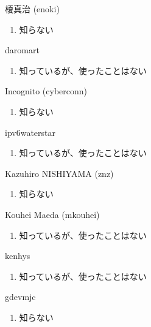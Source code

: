 \begin{prework}{ 榎真治 (enoki) }
  \begin{enumerate}
  \item 知らない
  \end{enumerate}
\end{prework}

\begin{prework}{ daromart }
  \begin{enumerate}
  \item 知っているが、使ったことはない
  \end{enumerate}
\end{prework}

\begin{prework}{ Incognito (cyberconn) }
  \begin{enumerate}
  \item 知らない
  \end{enumerate}
\end{prework}

\begin{prework}{ ipv6waterstar }
  \begin{enumerate}
  \item 知っているが、使ったことはない
  \end{enumerate}
\end{prework}

\begin{prework}{ Kazuhiro NISHIYAMA (znz) }
  \begin{enumerate}
  \item 知らない
  \end{enumerate}
\end{prework}

\begin{prework}{ Kouhei Maeda (mkouhei) }
  \begin{enumerate}
  \item 知っているが、使ったことはない
  \end{enumerate}
\end{prework}

\begin{prework}{ kenhys }
  \begin{enumerate}
  \item 知っているが、使ったことはない
  \end{enumerate}
\end{prework}

\begin{prework}{ gdevmjc }
  \begin{enumerate}
  \item 知らない
  \end{enumerate}
\end{prework}
